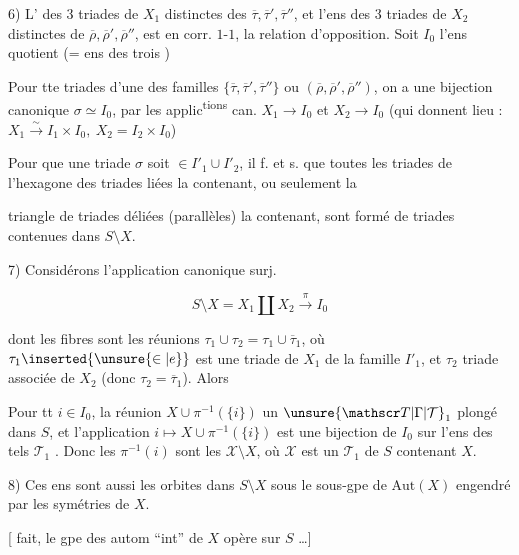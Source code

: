 6) L'  des 3 triades de $X_1$ distinctes des $\overline\tau,\overline\tau',\overline\tau''$, et l'ens  des 3 triades de $X_2$ distinctes de $\overline\rho,\overline\rho',\overline\rho''$, est en corr. $1$-$1$,  la relation d'opposition. 
Soit $I_0$ l'ens quotient (= ens des trois )

Pour tte triades  d'une des familles $\{\overline\tau,\overline\tau',\overline\tau''\}$ ou $(\overline\rho,\overline\rho',\overline\rho'')$,  on a une bijection canonique $\sigma\simeq I_0$,   par les applic\textsuperscript{tions} can. $X_1\longrightarrow I_0$ et $X_2\longrightarrow I_0$ (qui donnent lieu : $X_1\overset{\sim}{\longrightarrow}I_1\times I_0,\ X_2=I_2\times I_0$)


Pour que une triade $\sigma$ soit $\in I'_1\cup I'_2$, il f. et s. que toutes les triades de l'hexagone des triades liées la contenant, ou seulement la


triangle de triades déliées (parallèles) la contenant, sont formé de triades contenues dans $S\setminus X$.

7) Considérons l'application canonique surj.

\[
S\setminus X=X_1\amalg X_2\xrightarrow{\pi}I_0
\]

dont les fibres sont les réunions $\tau_1\cup\tau_2=\tau_1\cup\overline{\tau}_1$, où $\tau_1\inserted{\unsure{\in|e}}$ est une triade de $X_1$ de la famille $I'_1$, et $\tau_2$   triade associée de $X_2$  (donc $\tau_2=\overline{\tau}_1$). Alors

 Pour tt $i\in I_0$, la réunion $X\cup\pi^{-1}(\{i\})$  un $\unsure{\mathscr T|\Gamma|\mathcal T}_1$ plongé dans $S$,  et l'application $i\longmapsto X\cup\pi^{-1}(\{i\})$ est une bijection de $I_0$ sur l'ens des  tels $\mathscr T_1$ . Donc les $\pi^{-1}(i)$ sont les $\mathscr X\setminus X$, où $\mathscr X$ est un $\mathscr T_1$ de $S$ contenant $X$.

8) Ces ens sont aussi les orbites dans $S\setminus X$ sous le sous-gpe de $\mathrm{Aut}(X)$ engendré par les symétries   de $X$.

[ fait, le gpe des autom ``int'' de $X$ opère sur $S$ \ldots]


